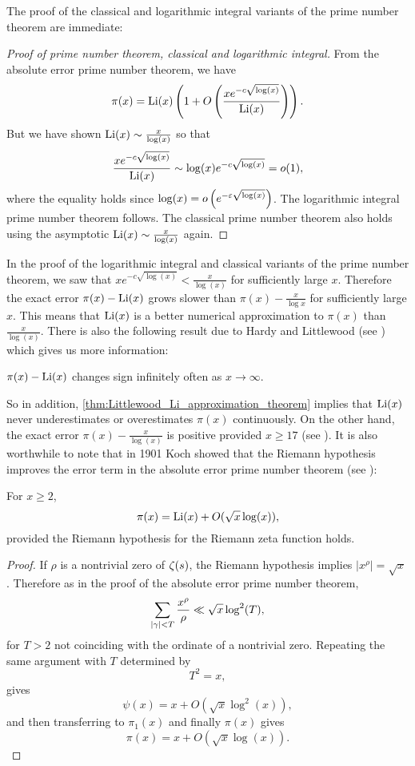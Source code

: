     The proof of the classical and logarithmic integral variants of the prime number theorem are immediate:

    \begin{proof}[Proof of prime number theorem, classical and logarithmic integral]
      From the absolute error prime number theorem, we have
      \[
        \pi(x) = \operatorname{\mathrm{Li}}(x)\left(1+O\left(\frac{xe^{-c\sqrt{\log(x)}}}{\operatorname{\mathrm{Li}}(x)}\right)\right).
      \]
      But we have shown $\operatorname{\mathrm{Li}}(x) \sim \frac{x}{\log(x)}$ so that
      \[
        \frac{xe^{-c\sqrt{\log(x)}}}{\operatorname{\mathrm{Li}}(x)} \sim \log(x)e^{-c\sqrt{\log(x)}} = o(1),
      \]
      where the equality holds since $\log(x) = o\left(e^{-\varepsilon\sqrt{\log(x)}}\right)$. The logarithmic integral prime number theorem follows. The classical prime number theorem also holds using the asymptotic $\operatorname{\mathrm{Li}}(x) \sim \frac{x}{\log(x)}$ again.
    \end{proof}
    
    In the proof of the logarithmic integral and classical variants of the prime number theorem, we saw that $xe^{-c\sqrt{\log(x)}} < \frac{x}{\log(x)}$ for sufficiently large $x$. Therefore the exact error $\pi(x)-\operatorname{\mathrm{Li}}(x)$ grows slower than $\pi(x)-\frac{x}{\log{x}}$ for sufficiently large $x$. This means that $\operatorname{\mathrm{Li}}(x)$ is a better numerical approximation to $\pi(x)$ than $\frac{x}{\log(x)}$. There is also the following result due to Hardy and Littlewood (see \cite{hardy1916contributions}) which gives us more information:

    \begin{proposition}\label{thm:Littlewood_Li_approximation_theorem}
      $\pi(x)-\operatorname{\mathrm{Li}}(x)$ changes sign infinitely often as $x \to \infty$.
    \end{proposition}

    So in addition, \cref{thm:Littlewood_Li_approximation_theorem} implies that $\operatorname{\mathrm{Li}}(x)$ never underestimates or overestimates $\pi(x)$ continuously. On the other hand, the exact error $\pi(x)-\frac{x}{\log(x)}$ is positive provided $x \ge 17$ (see \cite{rosser1962approximate}). It is also worthwhile to note that in 1901 Koch showed that the Riemann hypothesis improves the error term in the absolute error prime number theorem (see \cite{von1901distribution}):

    \begin{proposition}
      For $x \ge 2$,
      \[
        \pi(x) = \operatorname{\mathrm{Li}}(x)+O(\sqrt{x}\log(x)),
      \]
      provided the Riemann hypothesis for the Riemann zeta function holds.
    \end{proposition}
    \begin{proof}
      If $\rho$ is a nontrivial zero of $\zeta(s)$, the Riemann hypothesis implies $|x^{\rho}| = \sqrt{x}$. Therefore as in the proof of the absolute error prime number theorem,
      \[
        \sum_{|\gamma| < T}\frac{x^{\rho}}{\rho} \ll \sqrt{x}\log^{2}(T),
      \]
      for $T > 2$ not coinciding with the ordinate of a nontrivial zero. Repeating the same argument with $T$ determined by
      \[
        T^{2} = x,
      \]
      gives
      \[
        \psi(x) = x+O(\sqrt{x}\log^{2}(x)),
      \]
      and then transferring to $\pi_{1}(x)$ and finally $\pi(x)$ gives
      \[
        \pi(x) = x+O(\sqrt{x}\log(x)).
      \]
    \end{proof}
